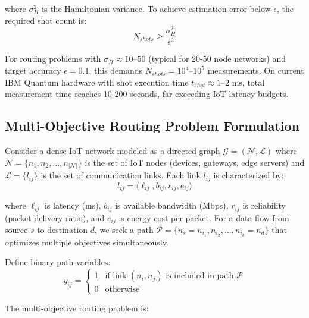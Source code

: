 \documentclass[lettersize,journal]{IEEEtran}
\begin{document}
where $\sigma^2_H$ is the Hamiltonian variance. To achieve estimation error below $\epsilon$, the required shot count is:
\begin{equation}
N_{shots} \geq \frac{\sigma^2_H}{\epsilon^2}
\label{eq:shot_requirement}
\end{equation}

For routing problems with $\sigma_H \approx 10$--$50$ (typical for 20-50 node networks) and target accuracy $\epsilon = 0.1$, this demands $N_{shots} = 10^4$--$10^5$ measurements. On current IBM Quantum hardware with shot execution time $t_{shot} \approx 1$--$2$ ms, total measurement time reaches 10-200 seconds, far exceeding IoT latency budgets.

\subsection{Multi-Objective Routing Problem Formulation}
\label{subsec:routing_problem}

Consider a dense IoT network modeled as a directed graph $\mathcal{G} = (\mathcal{N}, \mathcal{L})$ where $\mathcal{N} = \{n_1, n_2, \ldots, n_{|\mathcal{N}|}\}$ is the set of IoT nodes (devices, gateways, edge servers) and $\mathcal{L} = \{l_{ij}\}$ is the set of communication links. Each link $l_{ij}$ is characterized by:
\begin{equation}
l_{ij} = \langle \ell_{ij}, b_{ij}, r_{ij}, e_{ij} \rangle
\label{eq:link_attributes}
\end{equation}

where $\ell_{ij}$ is latency (ms), $b_{ij}$ is available bandwidth (Mbps), $r_{ij}$ is reliability (packet delivery ratio), and $e_{ij}$ is energy cost per packet. For a data flow from source $s$ to destination $d$, we seek a path $\mathcal{P} = \{n_s = n_{i_1}, n_{i_2}, \ldots, n_{i_k} = n_d\}$ that optimizes multiple objectives simultaneously.

Define binary path variables:
\begin{equation}
y_{ij} = \begin{cases}
1 & \text{if link } (n_i, n_j) \text{ is included in path } \mathcal{P} \\
0 & \text{otherwise}
\end{cases}
\label{eq:path_variable}
\end{equation}

The multi-objective routing problem is:
\end{document}
